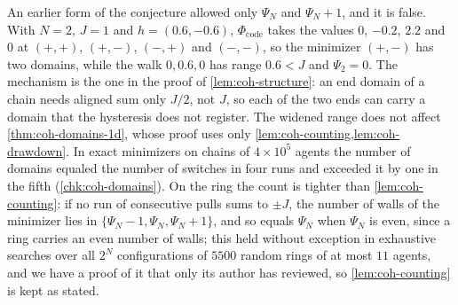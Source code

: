 An earlier form of the conjecture allowed only $\Psi_N$ and $\Psi_N+1$, and it is false. With $N=2$, $J=1$ and $h=(0.6,-0.6)$, $\Phi_{\mathrm{code}}$ takes the values $0$, $-0.2$, $2.2$ and $0$ at $(+,+)$, $(+,-)$, $(-,+)$ and $(-,-)$, so the minimizer $(+,-)$ has two domains, while the walk $0,0.6,0$ has range $0.6<J$ and $\Psi_2=0$. The mechanism is the one in the proof of \cref{lem:coh-structure}: an end domain of a chain needs aligned sum only $J/2$, not $J$, so each of the two ends can carry a domain that the hysteresis does not register. The widened range does not affect \cref{thm:coh-domains-1d}, whose proof uses only \cref{lem:coh-counting,lem:coh-drawdown}. In exact minimizers on chains of $4\times10^5$ agents the number of domains equaled the number of switches in four runs and exceeded it by one in the fifth (\cref{chk:coh-domains}). On the ring the count is tighter than \cref{lem:coh-counting}: if no run of consecutive pulls sums to $\pm J$, the number of walls of the minimizer lies in $\{\Psi_N-1,\Psi_N,\Psi_N+1\}$, and so equals $\Psi_N$ when $\Psi_N$ is even, since a ring carries an even number of walls; this held without exception in exhaustive searches over all $2^N$ configurations of $5500$ random rings of at most $11$ agents, and we have a proof of it that only its author has reviewed, so \cref{lem:coh-counting} is kept as stated.

